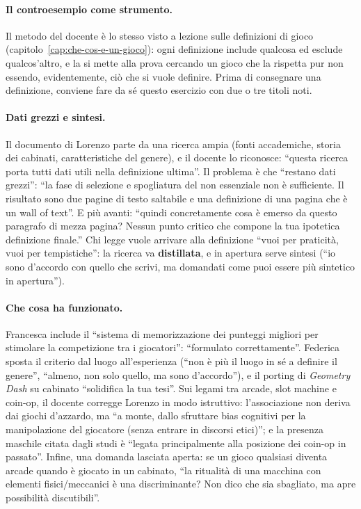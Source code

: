 \paragraph{Il controesempio come strumento.} Il metodo del docente è lo stesso
visto a lezione sulle definizioni di gioco
(capitolo~\ref{cap:che-cos-e-un-gioco}): ogni definizione include qualcosa ed
esclude qualcos'altro, e la si mette alla prova cercando un gioco che la
rispetta pur non essendo, evidentemente, ciò che si vuole definire. Prima di
consegnare una definizione, conviene fare da sé questo esercizio con due o
tre titoli noti.

\paragraph{Dati grezzi e sintesi.} Il documento di Lorenzo parte da una
ricerca ampia (fonti accademiche, storia dei cabinati, caratteristiche del
genere), e il docente lo riconosce: ``questa ricerca porta tutti dati utili
nella definizione ultima''. Il problema è che ``restano dati grezzi'': ``la
fase di selezione e spogliatura del non essenziale non è sufficiente. Il
risultato sono due pagine di testo saltabile e una definizione di una pagina
che è un wall of text''. E più avanti: ``quindi concretamente cosa è emerso da
questo paragrafo di mezza pagina? Nessun punto critico che compone la tua
ipotetica definizione finale.'' Chi legge vuole arrivare alla definizione
``vuoi per praticità, vuoi per tempistiche'': la ricerca va
\textbf{distillata}, e in apertura serve sintesi (``io sono d'accordo con
quello che scrivi, ma domandati come puoi essere più sintetico in
apertura'').

\paragraph{Che cosa ha funzionato.} Francesca include il ``sistema di
memorizzazione dei punteggi migliori per stimolare la competizione tra i
giocatori'': ``formulato correttamente''. Federica sposta il criterio dal
luogo all'esperienza (``non è più il luogo in sé a definire il genere'',
``almeno, non solo quello, ma sono d'accordo''), e il porting di
\emph{Geometry Dash} su cabinato ``solidifica la tua tesi''. Sui legami tra
arcade, slot machine e coin-op, il docente corregge Lorenzo in modo
istruttivo: l'associazione non deriva dai giochi d'azzardo, ma ``a monte, dallo
sfruttare bias cognitivi per la manipolazione del giocatore (senza entrare in
discorsi etici)''; e la presenza maschile citata dagli studi è ``legata
principalmente alla posizione dei coin-op in passato''. Infine, una domanda
lasciata aperta: se un gioco qualsiasi diventa arcade quando è giocato in un
cabinato, ``la ritualità di una macchina con elementi fisici/meccanici è una
discriminante? Non dico che sia sbagliato, ma apre possibilità
discutibili''.

